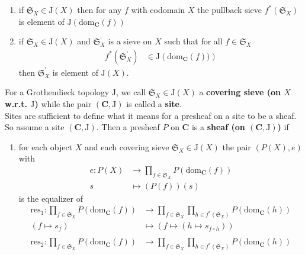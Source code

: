 \begin{exa}
\begin{enumerate}
\item[(J2)]
if $\mathfrak{S}_{X} \in \mathrm{J}(X)$ then for any $f$ with codomain $X$ the pullback sieve $f^{\ast}(\mathfrak{S}_{X})$ is element of $\mathrm{J}(\mathrm{dom}_{\mathbf{C}}(f))$
\item[(J3)]
if $\mathfrak{S}_{X} \in \mathrm{J}(X)$ and $\mathfrak{S}_{X}^{\backprime}$ is a sieve on $X$ such that for all $f \in \mathfrak{S}_{X}$
\begin{align*}
  f^{\ast}
  \left(
    \mathfrak{S}_{X}^{\backprime}
  \right)
  &\in
  \mathrm{J}
  \left(
    \mathrm{dom}_{\mathbf{C}}(f))
  \right)
\end{align*}
then $\mathfrak{S}_{X}^{\backprime}$ is element of $\mathrm{J}(X)$.
\end{enumerate}
For a Grothendieck topology $\mathrm{J}$, we call $\mathfrak{S}_{X} \in \mathrm{J}(X)$ a \textbf{covering sieve (on $X$ w.r.t. $\mathrm{J}$)} while the pair $(\mathbf{C},\mathrm{J})$ is called a \textbf{site}.
\\
Sites are sufficient to define what it means for a presheaf on a site to be a sheaf.
So assume a site $(\mathbf{C},\mathrm{J})$.
Then a presheaf $P$ on $\mathbf{C}$ is a \textbf{sheaf (on $(\mathbf{C},\mathrm{J})$)} if
\begin{enumerate}
\item[(DC)]
for each object $X$ and each covering sieve $\mathfrak{S}_{X} \in \mathrm{J}(X)$ the pair $(P(X),e)$ with
\begin{align*}
  e
  \colon
  P(X)
  &\rightarrow
  \prod_{f \in \mathfrak{S}_{X}}
  P(\mathrm{dom}_{\mathbf{C}}(f))
  \\
  s
  &\mapsto
  (P(f))(s)
\end{align*}
is the equalizer of
\begin{align*}
  \mathrm{res}_{1}
  \colon
  \prod_{f \in \mathfrak{S}_{X}}
  P(\mathrm{dom}_{\mathbf{C}}(f))
  &\rightarrow
  \prod_{f \in \mathfrak{S}_{X}}
  \prod_{h \in f^{\ast}(\mathfrak{S}_{X})}
  P(\mathrm{dom}_{\mathbf{C}}(h))  
  \\
  \left(
    f
    \mapsto
    s_{f}
  \right)
  &\mapsto
  \left(
    f
    \mapsto
    \left(
      h
      \mapsto
      s_{f \circ h}
    \right)
  \right)
  \\\\
  \mathrm{res}_{2}
  \colon
  \prod_{f \in \mathfrak{S}_{X}}
  P(\mathrm{dom}_{\mathbf{C}}(f))
  &\rightarrow
  \prod_{f \in \mathfrak{S}_{X}}
  \prod_{h \in f^{\ast}(\mathfrak{S}_{X})}
  P(\mathrm{dom}_{\mathbf{C}}(h))  
  \\

\end{align*}
\end{enumerate}
\end{exa}
